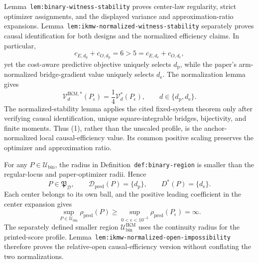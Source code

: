Lemma~\texttt{lem:binary-witness-stability} proves center-law regularity, strict optimizer assignments, and the displayed variance and approximation-ratio expansions.  Lemma~\texttt{lem:ikmw-normalized-witness-stability} separately proves causal identification for both designs and the normalized efficiency claims. In particular,
\[
 c_{E,d_{\mathrm p}}+c_{O,d_{\mathrm p}}=6>5
 =c_{E,d_{\mathrm e}}+c_{O,d_{\mathrm e}},
\]
yet the cost-aware predictive objective uniquely selects \(d_{\mathrm p}\), while the paper's arm-normalized bridge-gradient value uniquely selects \(d_{\mathrm e}\). The normalization lemma gives
\[
 \mathcal V_d^{\mathrm{IKM},*}(P_\epsilon)
 =\frac14\mathcal V_d^*(P_\epsilon),
 \qquad d\in\{d_{\mathrm p},d_{\mathrm e}\}. \tag{1}
\]
The normalized-stability lemma applies the cited fixed-system theorem only after verifying causal identification, unique square-integrable bridges, bijectivity, and finite moments. Thus (1), rather than the unscaled profile, is the anchor-normalized local causal-efficiency value. Its common positive scaling preserves the optimizer and approximation ratio.

For any \(P\in\mathcal U_{\mathrm{bin}}\), the radius in Definition~\texttt{def:binary-region} is smaller than the regular-locus and paper-optimizer radii. Hence
\[
 P\in\mathfrak P_{\mathcal D},\qquad
 \mathcal D_{\mathrm{pred}}(P)=\{d_{\mathrm p}\},
 \qquad D^*(P)=\{d_{\mathrm e}\}.
\]
Each center belongs to its own ball, and the positive leading coefficient in the center expansion gives
\[
 \sup_{P\in\mathcal U_{\mathrm{bin}}}\rho_{\mathrm{pred}}(P)
 \ge\sup_{0<\epsilon<10^{-3}}\rho_{\mathrm{pred}}(P_\epsilon)
 =\infty. \tag{2}
\]
The separately defined smaller region \(\mathcal U_{\mathrm{bin}}^{\mathrm{IKM}}\) uses the continuity radius for the printed-score profile. Lemma~\texttt{lem:ikmw-normalized-open-impossibility} therefore proves the relative-open causal-efficiency version without conflating the two normalizations.

